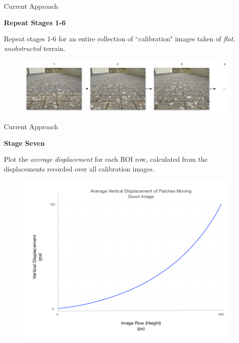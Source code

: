 \documentclass[10pt, compress]{beamer}
\begin{document}
\begin{frame}{Current Approach}

\textbf{Repeat Stages 1-6} \\ \vspace{0.2cm}

Repeat stages 1-6 for an entire collection of ``calibration" images taken of \emph{flat, unobstructed} terrain.

\begin{figure}[ht!]
\centering
\includegraphics[scale=0.3]{calibimages.png}
\end{figure}

\end{frame}

\begin{frame}{Current Approach}

\textbf{Stage Seven} \\ \vspace{0.2cm}

Plot the \emph{average displacement} for each ROI row, calculated from the displacements recorded over all calibration images.

\begin{figure}[ht!]
\centering
\includegraphics[scale=0.45]{graph.png}
\end{figure}

\end{frame}
\end{document}
